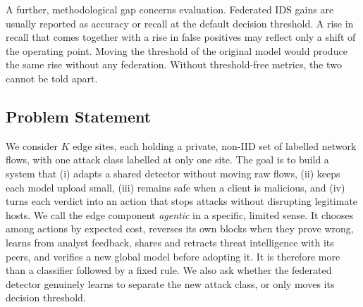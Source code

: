 A further, methodological gap concerns evaluation. Federated IDS gains are
usually reported as accuracy or recall at the default decision threshold.
A rise in recall that comes together with a rise in false positives may
reflect only a shift of the operating point. Moving the threshold of the
original model would produce the same rise without any federation. Without
threshold-free metrics, the two cannot be told apart.

\subsection{Problem Statement}
We consider $K$ edge sites, each holding a private, non-IID set of labelled
network flows, with one attack class labelled at only one site. The goal is
to build a system that (i) adapts a shared detector without moving raw flows,
(ii) keeps each model upload small, (iii) remains safe when a client is
malicious, and (iv) turns each verdict into an action that stops attacks
without disrupting legitimate hosts. We call the edge component
\emph{agentic} in a specific, limited sense. It chooses among actions by
expected cost, reverses its own blocks when they prove wrong, learns from
analyst feedback, shares and retracts threat intelligence with its peers,
and verifies a new global model before adopting it. It is therefore more than
a classifier followed by a fixed rule. We also ask whether the federated
detector genuinely learns to separate the new attack class, or only moves
its decision threshold.

